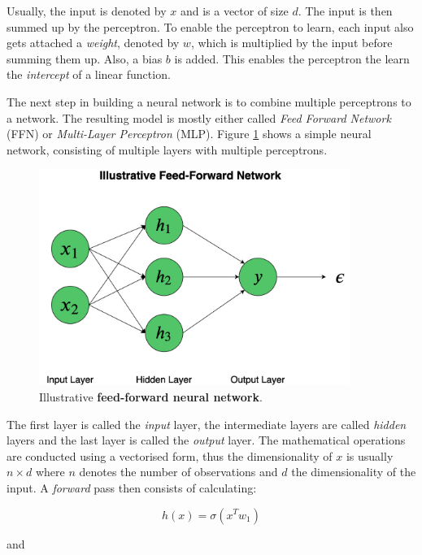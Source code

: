 \documentclass[11pt]{scrartcl}
\begin{document}
Usually, the input is denoted by $x$ and is a vector of size $d$. The input is then summed up by the perceptron. To enable the perceptron to learn, each input also gets attached a \textit{weight}, denoted by $w$, which is multiplied by the input before summing them up. Also, a bias $b$ is added. This enables the perceptron the learn the \textit{intercept} of a linear function.

The next step in building a neural network is to combine multiple perceptrons to a network. The resulting model is mostly either called \textit{Feed Forward Network} (FFN) or \textit{Multi-Layer Perceptron} (MLP). Figure \ref{fig:neural_network} shows a simple neural network, consisting of multiple layers with multiple perceptrons.

\begin{figure}[hbt]
	\center
	\includegraphics[width=0.9\textwidth]{img/general/neural_network.png}
	\caption{Illustrative \textcolor{viridis7}{\textbf{feed-forward neural network}}.}
	\label{fig:neural_network}
\end{figure}

The first layer is called the \textit{input} layer, the intermediate layers are called \textit{hidden} layers and the last layer is called the \textit{output} layer. The mathematical operations are conducted using a vectorised form, thus the dimensionality of $x$ is usually $n \times d$ where $n$ denotes the number of observations and $d$ the dimensionality of the input. A \textit{forward} pass then consists of calculating:

\begin{equation}
    h(x) = \sigma(x^T w_1)
\end{equation}

and
\end{document}
